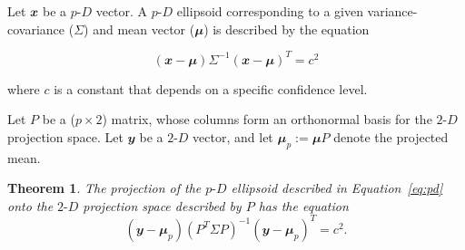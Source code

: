 \documentclass[
  12pt,
]{interact}
\newcommand\pD{$p\text{-}D$}
\newcommand\gD{$2\text{-}D$}
\newtheorem*{theorem}{Theorem}
\begin{document}
Let \(\mathbfit{x}\) be a \pD{} vector. A \pD{} ellipsoid corresponding
to a given variance-covariance (\(\Sigma\)) and mean vector
(\(\mathbfit{\mu}\)) is described by the equation

\begin{equation}
(\mathbfit{x}-\mathbfit{\mu}) \Sigma^{-1}(\mathbfit{x}-\mathbfit{\mu})^T = c^2
\label{eq:pd}
\end{equation}

where \(c\) is a constant that depends on a specific confidence level.

Let \(P\) be a (\(p\times 2\)) matrix, whose columns form an orthonormal
basis for the \gD{} projection space. Let \(\mathbfit{y}\) be a \gD{}
vector, and let \(\mathbfit{\mu}_p := \mathbfit{\mu} P\) denote the
projected mean.

\begin{theorem}
  The projection of the \pD{} ellipsoid described in Equation~\ref{eq:pd} onto the \gD{} projection space described by $P$ has the equation
\begin{equation}
(\mathbfit{y} - \mathbfit{\mu}_p)(P^T \Sigma P)^{-1}(\mathbfit{y} - \mathbfit{\mu}_p)^T = c^2.
\end{equation}
\end{theorem}
\end{document}
